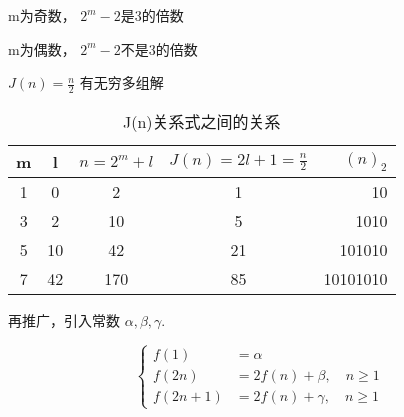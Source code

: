 m为奇数， $ 2^m - 2 $是3的倍数

m为偶数， $ 2^m - 2 $不是3的倍数

$ J(n) = \frac{n}{2} $ 有无穷多组解


\begin{table}[htbp]
	\centering
	\small
	\caption{J(n)关系式之间的关系}
	\begin{tabular}{ccccr}
		\toprule
		m & l & $ n = 2^m +l $ & $ J(n) = 2l+1 = \frac{n}{2} $ & $ (n)_2 $ \\
		\midrule
		1 & 0  & 2   & 1  & 10\\
		3 & 2  & 10  & 5  & 1010\\
		5 & 10 & 42  & 21 & 101010\\
		7 & 42 & 170 & 85 & 10101010\\
		\bottomrule
	\end{tabular}%
	\label{tab:J(n)关系式之间的关系}%
\end{table}%

\begin{remark}
	再推广，引入常数 $ \alpha, \beta, \gamma $.
\end{remark}

\begin{equation}\label{J(n)forConst}
	\left\{
	\begin{aligned}
		f(1)    &= \alpha\\
		f(2n)   &= 2f(n)+\beta,  \quad n\geqslant 1\\
		f(2n+1) &= 2f(n)+\gamma, \quad n\geqslant 1
	\end{aligned}
	\right.
\end{equation}


